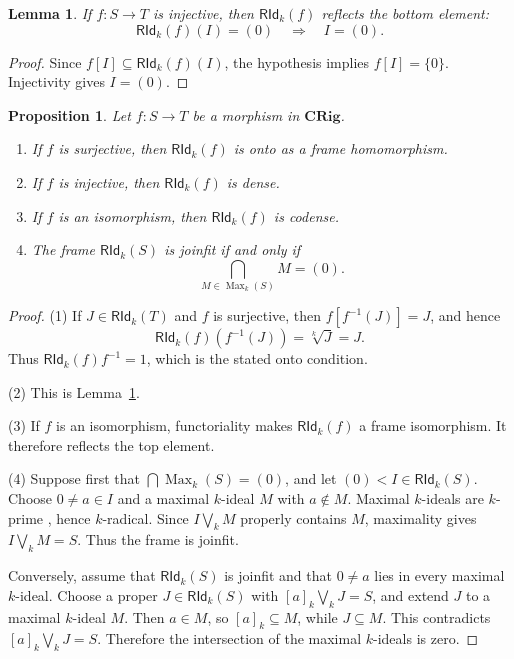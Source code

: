 \documentclass[12pt,leqno]{amsart}
\newcommand{\CRig}{\mathbf{CRig}}
\newcommand{\RIdk}{\mathsf{RId}_{k}}
\newcommand{\Maxk}{\operatorname{Max}_{k}}
\newtheorem{proposition}[theorem]{Proposition}
\newtheorem{lemma}[theorem]{Lemma}
\theoremstyle{definition}
\numberwithin{equation}{section}
\theoremstyle{remark}
\begin{document}
\begin{lemma}\label{lem:k-extension-reflects-zero}
If \(f\colon S\to T\) is injective, then \(\RIdk(f)\) reflects the bottom element:
\[
\RIdk(f)(I)=(0)\quad\Longrightarrow\quad I=(0).
\]
\end{lemma}

\begin{proof}
Since \(f[I]\subseteq\RIdk(f)(I)\), the hypothesis implies \(f[I]=\{0\}\). Injectivity gives \(I=(0)\).
\end{proof}

\begin{proposition}\label{prop:k-extension-properties}
Let \(f\colon S\to T\) be a morphism in \(\CRig\).
\begin{enumerate}
\item If $f$ is surjective, then \(\RIdk(f)\) is onto as a frame homomorphism.
\item If $f$ is injective, then \(\RIdk(f)\) is dense.
\item If $f$ is an isomorphism, then \(\RIdk(f)\) is codense.
\item The frame \(\RIdk(S)\) is joinfit if and only if
\[
\bigcap_{M\in\Maxk(S)}M=(0).
\]
\end{enumerate}
\end{proposition}

\begin{proof}
(1) If \(J\in\RIdk(T)\) and $f$ is surjective, then \(f[f^{-1}(J)]=J\), and hence
\[
\RIdk(f)(f^{-1}(J))=\sqrt[k]{J}=J.
\]
Thus \(\RIdk(f)f^{-1}=1\), which is the stated onto condition.

(2) This is Lemma~\ref{lem:k-extension-reflects-zero}.

(3) If $f$ is an isomorphism, functoriality makes \(\RIdk(f)\) a frame isomorphism. It therefore reflects the top element.

(4) Suppose first that \(\bigcap\Maxk(S)=(0)\), and let \((0)<I\in\RIdk(S)\). Choose \(0\neq a\in I\) and a maximal $k$-ideal $M$ with \(a\notin M\). Maximal $k$-ideals are $k$-prime \cite{Sen}, hence $k$-radical. Since \(I\bigvee_k M\) properly contains $M$, maximality gives \(I\bigvee_k M=S\). Thus the frame is joinfit.

Conversely, assume that \(\RIdk(S)\) is joinfit and that \(0\neq a\) lies in every maximal $k$-ideal. Choose a proper \(J\in\RIdk(S)\) with \([a]_k\bigvee_k J=S\), and extend $J$ to a maximal $k$-ideal $M$. Then \(a\in M\), so \([a]_k\subseteq M\), while \(J\subseteq M\). This contradicts \([a]_k\bigvee_k J=S\). Therefore the intersection of the maximal $k$-ideals is zero.
\end{proof}
\end{document}
